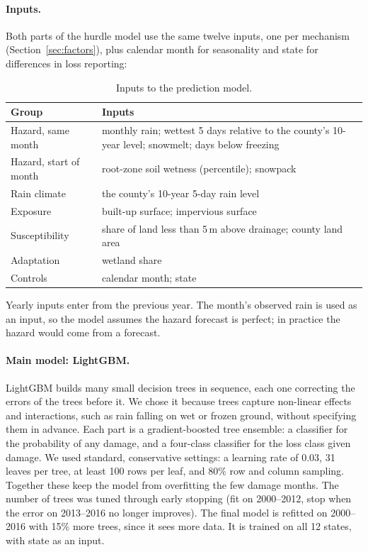\documentclass[10pt,twocolumn]{article}
\begin{document}
\paragraph{Inputs.} Both parts of the hurdle model use the same twelve inputs, one per mechanism (Section~\ref{sec:factors}), plus calendar month for seasonality and state for differences in loss reporting:

\begin{table}[H]
\centering
\small
{}
\setlength{\aboverulesep}{0pt}
\setlength{\belowrulesep}{0pt}
\renewcommand{\arraystretch}{1.25}
\begin{tabularx}{\linewidth}{@{}lL@{}}
\toprule
Group & Inputs \\
\midrule
Hazard, same month     & monthly rain; wettest 5 days relative to the county's 10-year level; snowmelt; days below freezing \\
Hazard, start of month & root-zone soil wetness (percentile); snowpack \\
Rain climate           & the county's 10-year 5-day rain level \\
Exposure               & built-up surface; impervious surface \\
Susceptibility         & share of land less than 5\,m above drainage; county land area \\
Adaptation             & wetland share \\
Controls               & calendar month; state \\
\bottomrule
\end{tabularx}
\caption{Inputs to the prediction model.}
\label{tab:pred-inputs}
\end{table}

Yearly inputs enter from the previous year. The month's observed rain is used
as an input, so the model assumes the hazard forecast is perfect; in practice
the hazard would come from a forecast.

\paragraph{Main model: LightGBM.} LightGBM builds many small decision trees in sequence, each one
correcting the errors of the trees before it. We chose it because trees capture non-linear
effects and interactions, such as rain falling on wet or frozen ground, without specifying them
in advance. Each part is a gradient-boosted tree ensemble:  a classifier for the probability of any damage, and a four-class classifier for the loss class given damage. We used standard, conservative settings: a learning rate of 0.03, 31 leaves per tree, at least 100 rows per leaf, and 80\%
row and column sampling. Together these keep the model from overfitting the few damage months.
The number of trees was tuned through early stopping (fit on 2000--2012, stop when the error on
2013--2016 no longer improves). The final model is refitted on 2000--2016 with 15\% more trees,
since it sees more data. It is trained on all 12 states, with state as an input.
\end{document}
